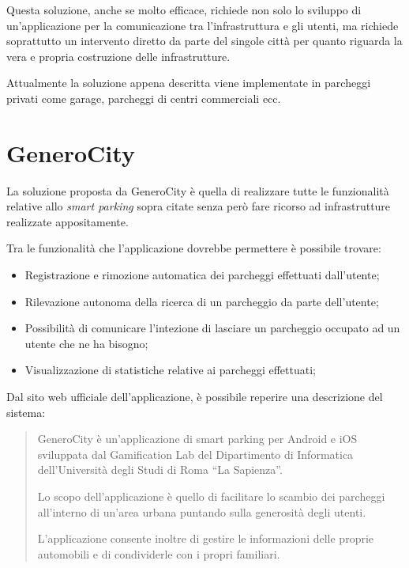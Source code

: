 Questa soluzione, anche se molto efficace, richiede non solo lo sviluppo di un'applicazione per la comunicazione tra l'infrastruttura e gli utenti, ma richiede soprattutto un intervento diretto da parte del singole città per quanto riguarda la vera e propria costruzione delle infrastrutture.

Attualmente la soluzione appena descritta viene implementate in parcheggi privati come garage, parcheggi di centri commerciali ecc.

\hypertarget{generocity}{%
\section{GeneroCity}\label{generocity}}

La soluzione proposta da GeneroCity è quella di realizzare tutte le funzionalità relative allo \emph{smart parking} sopra citate senza però fare ricorso ad infrastrutture realizzate appositamente.

Tra le funzionalità che l'applicazione dovrebbe permettere è possibile trovare:

\begin{itemize}

\item Registrazione e rimozione automatica dei parcheggi effettuati dall'utente;
\item Rilevazione autonoma della ricerca di un parcheggio da parte dell'utente;
\item Possibilità di comunicare l'intezione di lasciare un parcheggio occupato ad un utente che ne ha bisogno;
\item Visualizzazione di statistiche relative ai parcheggi effettuati;
\end{itemize}

Dal sito web ufficiale dell'applicazione, è possibile reperire una descrizione del sistema:

\begin{quote} GeneroCity è un'applicazione di smart parking per Android e iOS sviluppata dal Gamification Lab del Dipartimento di Informatica dell'Università degli Studi di Roma ``La Sapienza''.

Lo scopo dell'applicazione è quello di facilitare lo scambio dei parcheggi all'interno di un'area urbana puntando sulla generosità degli utenti.

L'applicazione consente inoltre di gestire le informazioni delle proprie automobili e di condividerle con i propri familiari. \cite{generocity}
\end{quote}


